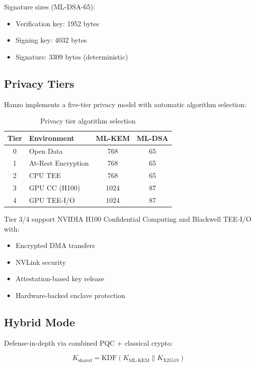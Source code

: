 Signature sizes (ML-DSA-65):
\begin{itemize}
\item Verification key: 1952 bytes
\item Signing key: 4032 bytes
\item Signature: 3309 bytes (deterministic)
\end{itemize}

\subsection{Privacy Tiers}

Hanzo implements a five-tier privacy model with automatic algorithm selection:

\begin{table}[h]
\centering
\small
\begin{tabular}{|c|l|c|c|}
\hline
\textbf{Tier} & \textbf{Environment} & \textbf{ML-KEM} & \textbf{ML-DSA} \\
\hline
0 & Open Data & 768 & 65 \\
1 & At-Rest Encryption & 768 & 65 \\
2 & CPU TEE & 768 & 65 \\
3 & GPU CC (H100) & 1024 & 87 \\
4 & GPU TEE-I/O & 1024 & 87 \\
\hline
\end{tabular}
\caption{Privacy tier algorithm selection}
\label{tab:privacy_tiers}
\end{table}

Tier 3/4 support NVIDIA H100 Confidential Computing and Blackwell TEE-I/O with:
\begin{itemize}
\item Encrypted DMA transfers
\item NVLink security
\item Attestation-based key release
\item Hardware-backed enclave protection
\end{itemize}

\subsection{Hybrid Mode}

Defense-in-depth via combined PQC + classical crypto:

\begin{equation}
K_{\text{shared}} = \text{KDF}(K_{\text{ML-KEM}} \parallel K_{\text{X25519}})
\end{equation}

